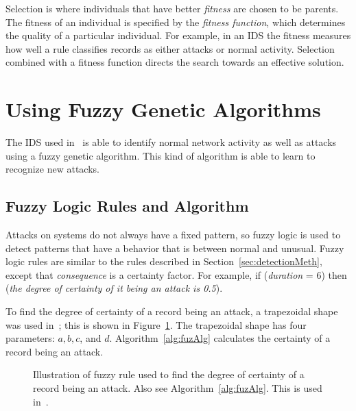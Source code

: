 \documentclass{sig-alternate}
\begin{document}
Selection is where individuals that have better \emph{fitness} are chosen to be parents. The fitness of an individual is specified by the \emph{fitness function}, which determines the quality of a particular individual. For example, in an IDS the fitness measures how well a rule classifies records as either attacks or normal activity. Selection combined with a fitness function directs the search towards an effective solution.~\cite{DBLP:journals/corr/abs-1204-6416}











\section{Using Fuzzy Genetic Algorithms}
\label{sec:fuzGenAlgImp}
The IDS used in~\cite{6496342, 6559603} is able to identify normal network activity as well as attacks using a fuzzy genetic algorithm. This kind of algorithm is able to learn to recognize new attacks.




\subsection{Fuzzy Logic Rules and Algorithm}
\label{sec:fuzzyRulesAndAlgorithm}
Attacks on systems do not always have a fixed pattern, so fuzzy logic is used to detect patterns that have a behavior that is between normal and unusual. Fuzzy logic rules are similar to the rules described in Section~\ref{sec:detectionMeth}, except that \emph{consequence} is a certainty factor. For example, if (\emph{duration} = 6) then (\emph{the degree of certainty of it being an attack is 0.5}).

To find the degree of certainty of a record being an attack, a trapezoidal shape was used in~\cite{6496342, 6559603}; this is shown in Figure~\ref{fig:trapFigure}. The trapezoidal shape has four parameters: $a, b, c$, and $d$. Algorithm~\ref{alg:fuzAlg} calculates the certainty of a record being an attack.


\begin{figure}
\caption{Illustration of fuzzy rule used to find the degree of certainty of a record being an attack. Also see Algorithm~\ref{alg:fuzAlg}. This is used in~\cite{6496342, 6559603}.}
\centering
{}
\label{fig:trapFigure}
\end{figure}
\end{document}
